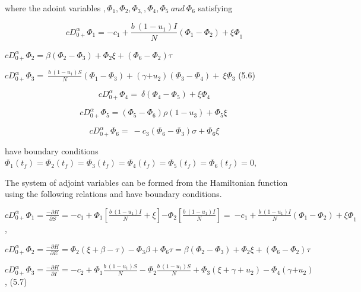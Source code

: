 \documentclass[10pt]{NSP1}
\begin{document}
where the adoint variables \(,\Phi_{1},\Phi_{2},\Phi_{3,},\Phi_{4},\Phi_{5}\ and\ \Phi_{6}\) satisfying

\[
{cD}_{0 +}^{\alpha}\Phi_{1} = {- c}_{1} + \frac{b\ \left( 1 - u_{1} \right)I}{N}\left( \Phi_{1} - \Phi_{2} \right) + {\xi\Phi}_{1}
\]

\({cD}_{0 +}^{\alpha}\Phi_{2} = \beta\left( \Phi_{2} - \Phi_{3} \right) + \Phi_{2}\xi + (\Phi_{6} - \Phi_{2})\tau\)

\({cD}_{0 +}^{\alpha}\Phi_{3} = \ \frac{b\ \left( 1 - u_{1} \right)S}{N}\left( \Phi_{1} - \Phi_{3} \right) + (\gamma{+ u}_{2})\left( \Phi_{3} - \Phi_{4} \right) + \ \xi\Phi_{3}\) (5.6)

\[
{cD}_{0 +}^{\alpha}\Phi_{4} = \ \delta\left( \Phi_{4} - \Phi_{5} \right) + \xi\Phi_{4}
\]

\[
{cD}_{0 +}^{\alpha}\Phi_{5} = \left( \Phi_{5} - \Phi_{6} \right)\rho\left( 1 - u_{3} \right) + \Phi_{5}\xi\
\]

\[
{cD}_{0 +}^{\alpha}\Phi_{6} = \ - c_{3}\left( \Phi_{6} - \Phi_{3} \right)\sigma + \Phi_{6}\xi
\]

have boundary conditions \(\Phi_{1}\left( t_{f} \right) = \Phi_{2}\left( t_{f} \right) = \Phi_{3}\left( t_{f} \right) = \Phi_{4}\left( t_{f} \right) = \Phi_{5}\left( t_{f} \right) = \Phi_{6}\left( t_{f} \right) = 0,\)

\par\vspace{14.0pt}\vspace{14.0pt}

The system of adjoint variables can be formed from the Hamiltonian function using the following relations and have boundary conditions.

\({cD}_{0 +}^{\alpha}\Phi_{1} = \frac{- \partial H}{\partial S} = {- c}_{1} + \Phi_{1}\left\lbrack \frac{b\ \left( 1 - u_{1} \right)I}{N} + \xi \right\rbrack{- \Phi}_{2}\left\lbrack \frac{b\ \left( 1 - u_{1} \right)I}{N} \right\rbrack = \ {- c}_{1} + \frac{b\ \left( 1 - u_{1} \right)I}{N}\left( \Phi_{1} - \Phi_{2} \right) + {\xi\Phi}_{1}\),

\({cD}_{0 +}^{\alpha}\Phi_{2} = \frac{- \partial H}{\ \ \partial E} = \Phi_{2}(\xi + \beta - \tau) - \Phi_{3}\beta + \Phi_{6}\tau = \beta\left( \Phi_{2} - \Phi_{3} \right) + \Phi_{2}\xi + (\Phi_{6} - \Phi_{2})\tau\)

\({cD}_{0 +}^{\alpha}\Phi_{3} = \frac{- \partial H}{\ \ \partial I} = - c_{2} + \Phi_{1}\frac{b\ \left( 1 - u_{1} \right)S}{N} - \Phi_{2}\frac{b\ \left( 1 - u_{1} \right)S}{N} + \Phi_{3}\left( \xi + \gamma + u_{2} \right) - \Phi_{4}(\gamma{+ u}_{2})\), (5.7)
\end{document}
